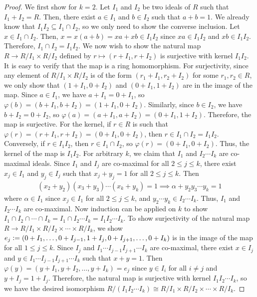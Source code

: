 \begin{proof}
    We first show for $k = 2$. Let $I_{1}$ and $I_{2}$ be two ideals of $R$ such that $I_{1} + I_{2} = R$. Then, there exist $a \in I_{1}$ and $b \in I_{2}$ such that $a + b = 1$. We already know that $I_{1} I_{2} \subseteq I_{1} \cap I_{2}$, so we only need to show the converse inclusion. Let $x \in I_{1} \cap I_{2}$. Then, $x = x(a + b) = xa + xb \in I_{1} I_{2}$ since $xa \in I_{1} I_{2}$ and $xb \in I_{1} I_{2}$. Therefore, $I_{1} \cap I_{2} = I_{1} I_{2}$. We now wish to show the natural map $R \to R/I_{1} \times R/I_{2}$ defined by $r \mapsto (r + I_{1}, r + I_{2})$ is surjective with kernel $I_{1} I_{2}$. It is easy to verify that the map is a ring homomorphism. For surjectivity, since any element of $R/I_{1} \times R/I_{2}$ is of the form $(r_{1} + I_{1}, r_{2} + I_{2})$ for some $r_{1}, r_{2} \in R$, we only show that $(1+I_{1}, 0 + I_{2})$ and $(0 + I_{1}, 1 + I_{2})$ are in the image of the map. Since $a \in I_{1}$, we have $a + I_{1} = 0 + I_{1}$, so $\varphi(b) = (b + I_{1}, b + I_{2}) = (1 + I_{1}, 0 + I_{2})$. Similarly, since $b \in I_{2}$, we have $b + I_{2} = 0 + I_{2}$, so $\varphi(a) = (a + I_{1}, a + I_{2}) = (0 + I_{1}, 1 + I_{2})$. Therefore, the map is surjective. For the kernel, if $r \in R$ is such that $\varphi(r) = (r + I_{1}, r + I_{2}) = (0 + I_{1}, 0 + I_{2})$, then $r \in I_{1} \cap I_{2} = I_{1}I_{2}$. Conversely, if $r \in I_{1}I_{2}$, then $r \in I_{1} \cap I_{2}$, so $\varphi(r) = (0 + I_{1}, 0 + I_{2})$. Thus, the kernel of the map is $I_{1}I_{2}$. For arbitrary $k$, we claim that $I_{1}$ and $I_{2}\cdots I_{k}$ are co-maximal ideals. Since $I_{1}$ and $I_{j}$ are co-maximal for all $2 \leq j \leq k$, there exist $x_{j} \in I_{1}$ and $y_{j} \in I_{j}$ such that $x_{j} + y_{j} = 1$ for all $2 \leq j \leq k$. Then 
    \begin{align}
        (x_{2}+y_{2})(x_{3}+y_{3}) \cdots (x_{k}+y_{k}) = 1 \implies \alpha + y_{2}y_{3} \cdots y_{k} = 1
    \end{align}
    where $\alpha \in I_{1}$ since $x_{j} \in I_{1}$ for all $2 \leq j \leq k$, and $y_{2} \cdots y_{k} \in I_{2} \cdots I_{k}$. Thus, $I_{1}$ and $I_{2} \cdots I_{k}$ are co-maximal. Now induction can be applied on $k$ to show $I_{1} \cap I_{2} \cap \cdots \cap I_{k} = I_{1} \cap I_{2} \cdots I_{k} = I_{1} I_{2} \cdots I_{k}$. To show surjectivity of the natural map $R \to R/I_{1} \times R/I_{2} \times \cdots \times R/I_{k}$, we show $e_{j} \vcentcolon= (0 + I_{1}, \ldots, 0 + I_{j-1}, 1 + I_{j}, 0 + I_{j+1}, \ldots, 0 + I_{k})$ is in the image of the map for all $1 \leq j \leq k$. Since $I_{j}$ and $I_{1} \cdots I_{j-1} I_{j+1} \cdots I_{k}$ are co-maximal, there exist $x \in I_{j}$ and $y \in I_{1} \cdots I_{j-1} I_{j+1} \cdots I_{k}$ such that $x + y = 1$. Then $\varphi(y) = (y + I_{1}, y + I_{2}, \ldots, y + I_{k}) = e_{j}$ since $y \in I_{i}$ for all $i \neq j$ and $y + I_{j} = 1 + I_{j}$. Therefore, the natural map is surjective with kernel $I_{1}I_{2} \cdots I_{k}$, so we have the desired isomorphism $R/(I_{1} I_{2} \cdots I_{k}) \cong R/I_{1} \times R/I_{2} \times \cdots \times R/I_{k}$.
\end{proof}

